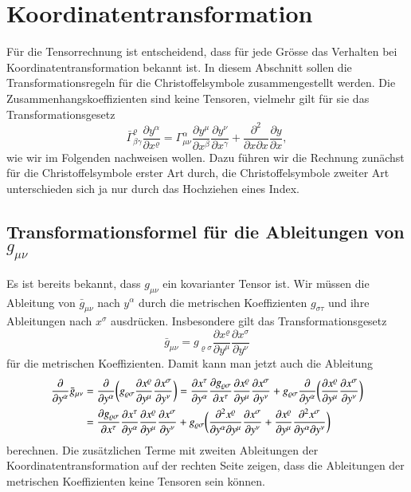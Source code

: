 %
%
%
\section{Koordinatentransformation}
Für die Tensorrechnung ist entscheidend, dass für jede Grösse das Verhalten
bei Koordinatentransformation bekannt ist.
In diesem Abschnitt sollen die Transformationsregeln für die
Christoffelsymbole zusammengestellt werden.
Die Zusammenhangskoeffizienten sind keine Tensoren, vielmehr gilt für sie das
Transformationsgesetz
\[
\bar\Gamma^\varrho_{\beta\gamma}
\frac{\partial y^\alpha}{\partial x^\varrho}
=
\Gamma^\alpha_{\mu\nu}
\frac{\partial y^\mu}{\partial x^\beta}
\frac{\partial y^\nu}{\partial x^\gamma}
+
\frac{\partial^2}{\partial x\partial x}
\frac{\partial y}{\partial x},
\]
wie wir im Folgenden nachweisen wollen.
Dazu führen wir die Rechnung zunächst für die Christoffelsymbole
erster Art durch, die Christoffelsymbole zweiter Art unterschieden sich
ja nur durch das Hochziehen eines Index.

\subsection{Transformationsformel für die Ableitungen von $g_{\mu\nu}$}
Es ist bereits bekannt, dass $g_{\mu\nu}$ ein kovarianter Tensor ist.
Wir müssen die Ableitung von $\bar g_{\mu\nu}$ nach $y^\alpha$ durch
die metrischen Koeffizienten $g_{\sigma\tau}$ und ihre Ableitungen
nach $x^\sigma$ ausdrücken.
Insbesondere gilt das Transformationsgesetz
\begin{equation*}
\bar g_{\mu\nu}
=
g_{\varrho\sigma}
\frac{\partial x^\varrho}{\partial y^\mu}
\frac{\partial x^\sigma}{\partial y^\nu}
\end{equation*}
für die metrischen Koeffizienten. 
Damit kann man jetzt auch die Ableitung 
\begin{align}
\frac{\partial}{\partial y^\alpha}\bar g_{\mu\nu}
&=
\frac{\partial}{\partial y^\alpha} 
\biggl(
g_{\varrho\sigma}
\frac{\partial x^\varrho}{\partial y^\mu}
\frac{\partial x^\sigma}{\partial y^\nu}
\biggr)
=
\frac{\partial x^\tau}{\partial y^\alpha}
\frac{\partial g_{\varrho\sigma} }{\partial x^\tau}
\frac{\partial x^\varrho}{\partial y^\mu}
\frac{\partial x^\sigma}{\partial y^\nu}
+
g_{\varrho\sigma}
\frac{\partial}{\partial y^\alpha} 
\biggl(
\frac{\partial x^\varrho}{\partial y^\mu}
\frac{\partial x^\sigma}{\partial y^\nu}
\biggr)
\notag
\\
&=
\frac{\partial g_{\varrho\sigma}}{\partial x^\tau}
\frac{\partial x^\tau}{\partial y^\alpha}
\frac{\partial x^\varrho}{\partial y^\mu}
\frac{\partial x^\sigma}{\partial y^\nu}
+
g_{\varrho\sigma}
\biggl(
\frac{\partial^2 x^\varrho}{\partial y^\alpha\partial y^\mu}
\frac{\partial x^\sigma}{\partial y^\nu}
+
\frac{\partial x^\varrho}{\partial y^\mu}
\frac{\partial^2 x^\sigma}{\partial y^\alpha\partial y^\nu}
\biggr)
\label{skript:trafo:gabl}
\end{align}
berechnen.
Die zusätzlichen Terme mit zweiten Ableitungen der Koordinatentransformation
auf der rechten Seite zeigen, dass die Ableitungen der metrischen Koeffizienten
keine Tensoren sein können.

